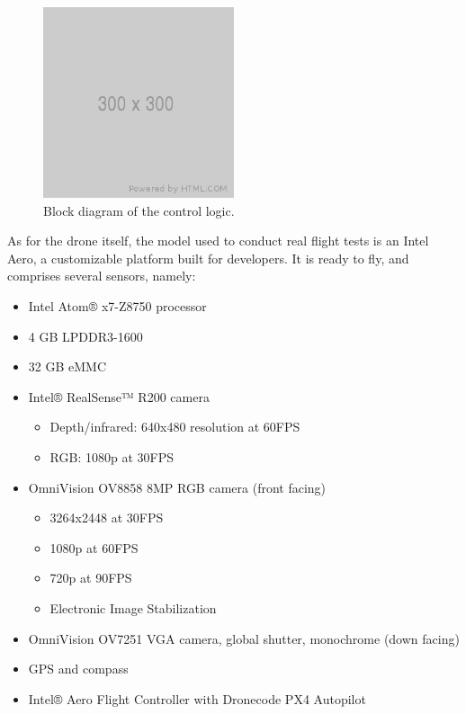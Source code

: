 \begin{figure}[h]
	\centering
	\includegraphics[width=0.5\textwidth]{figure/300x300.png}
	\caption{Block diagram of the control logic.}
	\label{fig:control-block}
\end{figure}

As for the drone itself, the model used to conduct real flight tests is an Intel
Aero, a customizable platform built for developers. It is ready to fly, and
comprises several sensors, namely:

\begin{itemize}
	\item{Intel Atom® x7-Z8750 processor}
	\item{4 GB LPDDR3-1600}
	\item{32 GB eMMC}
	\item{Intel® RealSense™ R200 camera}
		\begin{itemize}
			\item{Depth/infrared: 640x480 resolution at 60FPS}
			\item{RGB: 1080p at 30FPS}
		\end{itemize}
	\item{OmniVision OV8858 8MP RGB camera (front facing)}
		\begin{itemize}
			\item{3264x2448 at 30FPS}
			\item{1080p at 60FPS}
			\item{720p at 90FPS}
			\item{Electronic Image Stabilization}
		\end{itemize}
	\item{OmniVision OV7251 VGA camera, global shutter, monochrome (down facing)}
	\item{GPS and compass}
	\item{Intel® Aero Flight Controller with Dronecode PX4 Autopilot}
\end{itemize}

